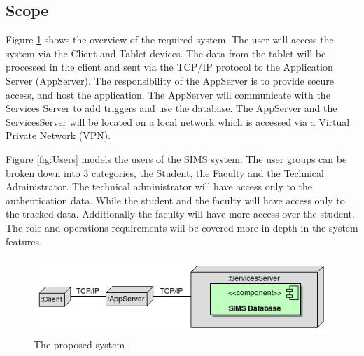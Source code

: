 \documentclass{journal}
\begin{document}
\subsection{Scope}

Figure \ref{fig:sysOver} shows the overview of the required system. The user will access the system via the Client and Tablet devices. The data from the tablet will be processed in the client and sent via the TCP/IP protocol to the Application Server (AppServer). The responsibility of the AppServer is to provide secure access, and host the application. The AppServer will communicate with the Services Server to add triggers and use the database. The AppServer and the ServicesServer will be located on a local network which is accessed via a Virtual Private Network (VPN).


Figure \ref{fig:Users} models the users of the SIMS system. The user groups can be broken down into 3 categories, the Student, the Faculty and the Technical Administrator. The technical administrator will have access only to the authentication data. While the student and the faculty will have access only to the tracked data. Additionally the faculty will have more access over the student. The role and operations requirements will be covered more in-depth in the system features.

\begin{figure}[!h]
\begin{center}
\includegraphics[width=522px]{diagrams/scope} \caption{ The proposed system } \label{fig:sysOver}

\end{center}
\end{figure}
\end{document}
